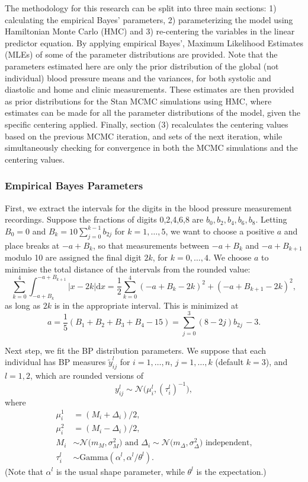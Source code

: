 \documentclass[
]{article}
\begin{document}
The methodology for this research can be split into three main sections: 1) calculating the empirical Bayes' parameters, 2) parameterizing the model using Hamiltonian Monte Carlo (HMC) and 3) re-centering the variables in the linear predictor equation. By applying empirical Bayes', Maximum Likelihood Estimates (MLEs) of some of the parameter distributions are provided. Note that the parameters estimated here are only the prior distribution of the global (not individual) blood pressure means and the variances, for both systolic and diastolic and home and clinic measurements. These estimates are then provided as prior distributions for the Stan MCMC simulations using HMC, where estimates can be made for all the parameter distributions of the model, given the specific centering applied. Finally, section (3) recalculates the centering values based on the previous MCMC iteration, and sets of the next iteration, while simultaneously checking for convergence in both the MCMC simulations and the centering values.

\hypertarget{empirical-bayes-parameters}{%
\subsubsection{Empirical Bayes Parameters}\label{empirical-bayes-parameters}}

First, we extract the intervals for the digits in the blood pressure measurement recordings. Suppose the fractions of digits 0,2,4,6,8 are \(b_0,b_2,b_4,b_6,b_8\).
Letting \(B_0=0\) and \(B_k=10\sum_{j=0}^{k-1}b_{2j}\) for \(k=1,\dots,5\),
we want to choose a positive \(a\) and place breaks at \(-a+B_k\), so that measurements between \(-a+B_k\) and \(-a+B_{k+1}\) modulo
10 are assigned the final digit \(2k\), for \(k=0,\dots,4\).
We choose \(a\) to minimise the total distance of the intervals from the rounded value:
\[
  \sum_{k=0}^4 \int_{-a+B_k}^{-a+B_{k+1}} \bigl| x-2k\bigr|\mathrm{d} x=\frac12\sum_{k=0}^4 \left(-a+B_k-2k\right)^2 + \left(-a+B_{k+1}-2k\right)^2,
\]
as long as \(2k\) is in the appropriate interval. This is minimized at
\[
  a= \frac{1}{5}\left(B_1+B_2+B_3+B_4 - 15\right)=\sum_{j=0}^3 (8-2j) b_{2j} \, - 3.
\]

Next step, we fit the BP distribution parameters. We suppose that each individual has BP measures
\(\tilde{y}_{ij}^l\) for \(i=1,\dots,n\), \(j=1,\dots,k\) (default \(k=3\)),
and \(l=1,2\), which are rounded versions of
\[
  y_{ij}^l \sim \mathcal{N}\bigl( \mu_i^l,(\tau_i^l)^{-1}\bigr),
\]
where
\begin{align*}
\mu_i^1&=(M_i+\Delta_i)/2,\\
\mu_i^2&=(M_i-\Delta_i)/2,\\
M_i&\sim \mathcal{N}\bigl(m_M,\sigma^2_M) \text{ and }
  \Delta_i\sim \mathcal{N}\bigl(m_\Delta,\sigma^2_\Delta) \text{ independent,}\\
  \tau_i^l &\sim \mathrm{Gamma}(\alpha^l,\alpha^l/\theta^l ).
\end{align*}
(Note that \(\alpha^l\) is the usual shape parameter,
while \(\theta^l\) is the expectation.)
\end{document}
